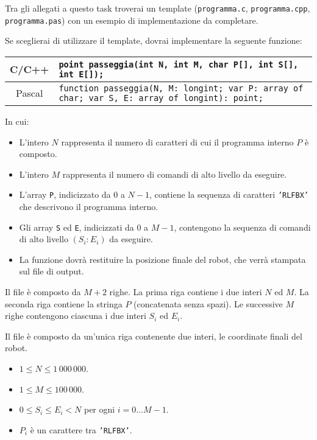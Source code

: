 \begin{warning}
Tra gli allegati a questo task troverai un template (\texttt{programma.c}, \texttt{programma.cpp}, \texttt{programma.pas}) con un esempio di implementazione da completare.
\end{warning}

Se sceglierai di utilizzare il template, dovrai implementare la seguente funzione:
\begin{center}\begin{tabularx}{\textwidth}{|c|X|}
\hline
C/C++  & \verb|point passeggia(int N, int M, char P[], int S[], int E[]);|\\
\hline
Pascal & \footnotesize{\verb|function passeggia(N, M: longint; var P: array of char; var S, E: array of longint): point;|}\\
\hline
\end{tabularx}\end{center}
In cui:
\begin{itemize}[nolistsep]
  \item L'intero $N$ rappresenta il numero di caratteri di cui il programma interno $P$ \`e composto.
  \item L'intero $M$ rappresenta il numero di comandi di alto livello da eseguire.
  \item L'array \texttt{P}, indicizzato da $0$ a $N-1$, contiene la sequenza di caratteri \texttt{'RLFBX'} che descrivono il programma interno.
  \item Gli array \texttt{S} ed \texttt{E}, indicizzati da $0$ a $M-1$, contengono la sequenza di comandi di alto livello $(S_i:E_i)$ da eseguire.
  \item La funzione dovrà restituire la posizione finale del robot, che verrà stampata sul file di output.
\end{itemize}

\InputFile
Il file  è composto da $M+2$ righe. La prima riga contiene i due interi $N$ ed $M$. La seconda riga contiene la stringa $P$ (concatenata senza spazi). Le successive $M$ righe contengono ciascuna i due interi $S_i$ ed $E_i$.

\OutputFile
Il file \outputfile{} è composto da un'unica riga contenente due interi, le coordinate finali del robot.

\Constraints
\begin{itemize}[nolistsep, itemsep=2mm]
	\item $1 \le N \le 1\,000\,000$.
	\item $1 \le M \le 100\,000$.
	\item $0 \le S_i \le E_i < N$ per ogni $i=0\ldots M-1$.
	\item $P_i$ \`e un carattere tra \texttt{'RLFBX'}.
\end{itemize}

